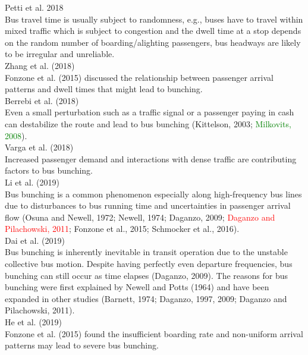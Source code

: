 \documentclass{article}
\begin{document}
\noindent \textrm{Petti et al. 2018}\\
Bus travel time is usually subject to randomness, 
e.g., buses have to travel within mixed traffic 
which is subject to congestion and the dwell time at a stop depends on the random number of boarding/alighting passengers, 
bus headways are likely to be irregular and unreliable.\\

\noindent \textrm{Zhang et al. (2018)}\\
\textrm{Fonzone et al. (2015)} discussed the relationship 
between passenger arrival patterns and dwell times that might lead to bunching.\\

\noindent \textrm{Berrebi et al. (2018)}\\
Even a small perturbation such as a traffic signal 
or a passenger paying in cash 
can destabilize the route and lead to bus bunching 
\textrm{(Kittelson, 2003; \textcolor{green}{Milkovits, 2008})}.\\

\noindent \textrm{Varga et al. (2018)}\\
Increased passenger demand and interactions with dense traffic 
are contributing factors to bus bunching.\\

\noindent \textrm{Li et al. (2019)}\\
Bus bunching is a common phenomenon especially along high-frequency bus lines
due to disturbances to bus running time 
and uncertainties in passenger arrival flow 
\textrm{(Osuna and Newell, 1972; Newell, 1974; Daganzo, 2009; 
\textcolor{red}{Daganzo and Pilachowski, 2011}; Fonzone et al., 2015; Schmocker et al., 2016)}.\\

\noindent \textrm{Dai et al. (2019)}\\
Bus bunching is inherently inevitable in transit operation 
due to the unstable collective bus motion. 
Despite having perfectly even departure frequencies, 
bus bunching can still occur as time elapses 
\textrm{(Daganzo, 2009)}. 
The reasons for bus bunching were first explained by \textrm{Newell and Potts (1964)} 
and have been expanded in other studies 
\textrm{(Barnett, 1974; Daganzo, 1997, 2009; Daganzo and Pilachowski, 2011)}.\\

\noindent \textrm{He et al. (2019)}\\
\textrm{Fonzone et al. (2015)} found the insufficient boarding rate 
and non-uniform arrival patterns may lead to severe bus bunching.\\
\end{document}

